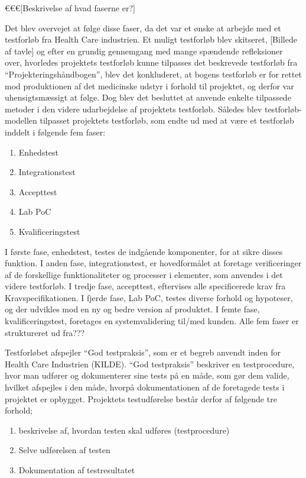 €€€[Beskrivelse af hvad faserne er?]


Det blev overvejet at følge disse faser, da det var et ønske at arbejde med et testforløb fra Health Care industrien. Et muligt testforløb blev skitseret, [Billede af tavle] og efter en grundig gennemgang med mange spændende refleksioner over, hvorledes projektets testforløb kunne tilpasses det beskrevede testforløb fra “Projekteringshåndbogen”, blev det konkluderet, at bogens testforløb er for rettet mod produktionen af det medicinske udstyr i forhold til projektet, og derfor var uhensigtsmæssigt at følge. Dog blev det besluttet at anvende enkelte tilpassede metoder i den videre udarbejdelse af projektets testforløb. Således blev testforløb-modellen tilpasset projektets testforløb, som endte ud med at være et testforløb inddelt i følgende fem faser:    

	\begin{enumerate}
		\item Enhedstest
		\item Integrationstest
		\item Accepttest
		\item Lab PoC
		\item Kvalificeringstest 
	\end{enumerate}

I første fase, enhedstest, testes de indgående komponenter, for at sikre disses funktion. I anden fase, integrationstest, er hovedformålet at foretage verificeringer af de forskellige funktionaliteter og processer i elementer, som anvendes i det videre testforløb. I tredje fase, accepttest, eftervises alle specificerede krav fra Kravspecifikationen. I fjerde fase, Lab PoC, testes diverse forhold og hypoteser, og der udvikles mod en ny og bedre version af produktet. I femte fase, kvalificeringstest, foretages en systemvalidering til/med kunden. Alle fem faser er struktureret ud fra???


Testforløbet afspejler “God testpraksis”, som er et begreb anvendt inden for Health Care Industrien (KILDE). “God testpraksis” beskriver en testprocedure, hvor man udfører og dokumenterer sine tests på en måde, som gør dem valide, hvilket afspejles i den måde, hvorpå dokumentationen af de foretagede tests i projektet er opbygget. Projektets testudførelse består derfor af følgende tre forhold;

	\begin{enumerate}
	\item beskrivelse af, hvordan testen skal udføres (testprocedure) 
	\item Selve udførelsen af testen 
	\item Dokumentation af testresultatet
	\end{enumerate}

